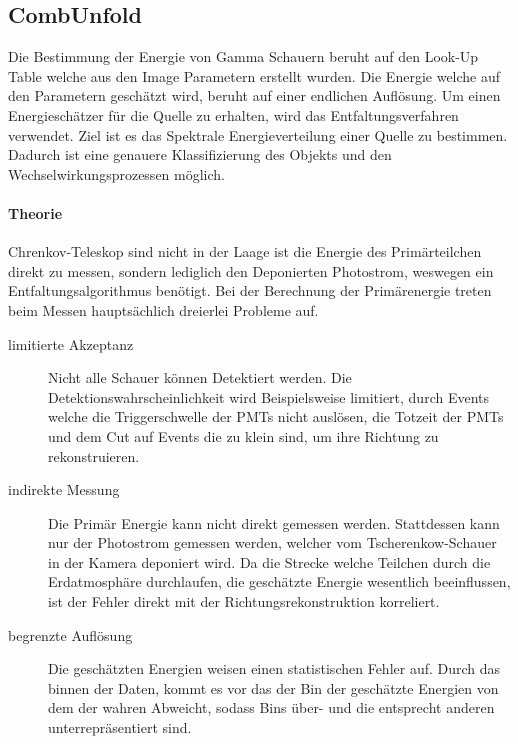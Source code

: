 \subsection{CombUnfold}%
\label{sub:combunfold}
Die Bestimmung der Energie von Gamma Schauern beruht auf den Look-Up Table
welche aus den Image Parametern erstellt wurden. 
Die Energie welche auf den Parametern geschätzt wird, beruht auf einer 
endlichen Auflösung.
Um einen Energieschätzer für die Quelle zu erhalten, 
wird das Entfaltungsverfahren verwendet.
Ziel ist es das Spektrale Energieverteilung einer Quelle zu bestimmen.
Dadurch ist eine genauere Klassifizierung des Objekts und den
Wechselwirkungsprozessen möglich. 

\paragraph{Theorie}%
\label{par:theorie}
Chrenkov-Teleskop sind nicht in der Laage ist die Energie 
des Primärteilchen direkt zu messen,
sondern lediglich den Deponierten Photostrom,
weswegen ein Entfaltungsalgorithmus benötigt.
Bei der Berechnung der Primärenergie treten beim Messen hauptsächlich dreierlei Probleme auf.

\begin{description}
    \item[\quad limitierte Akzeptanz]
        Nicht alle Schauer können Detektiert werden. 
        Die Detektionswahrscheinlichkeit wird Beispielsweise limitiert,
        durch Events welche die Triggerschwelle der PMTs nicht auslösen,
        die Totzeit der PMTs 
        und dem Cut auf Events die zu klein sind,
        um ihre Richtung zu rekonstruieren.

    \item[\quad indirekte Messung]
        Die Primär Energie kann nicht direkt gemessen werden.
        Stattdessen kann nur der Photostrom gemessen werden,
        welcher vom Tscherenkow-Schauer in der Kamera deponiert wird.
        Da die Strecke welche Teilchen durch die Erdatmosphäre 
        durchlaufen,
        die geschätzte Energie wesentlich beeinflussen,
        ist der Fehler direkt mit der Richtungsrekonstruktion korreliert.

    \item[\quad begrenzte Auflösung] 
        Die geschätzten Energien weisen einen statistischen Fehler auf. 
        Durch das binnen der Daten, 
        kommt es vor das der Bin der geschätzte Energien von dem der wahren
        Abweicht,
        sodass Bins über- und die entsprecht anderen unterrepräsentiert sind.
\end{description}

